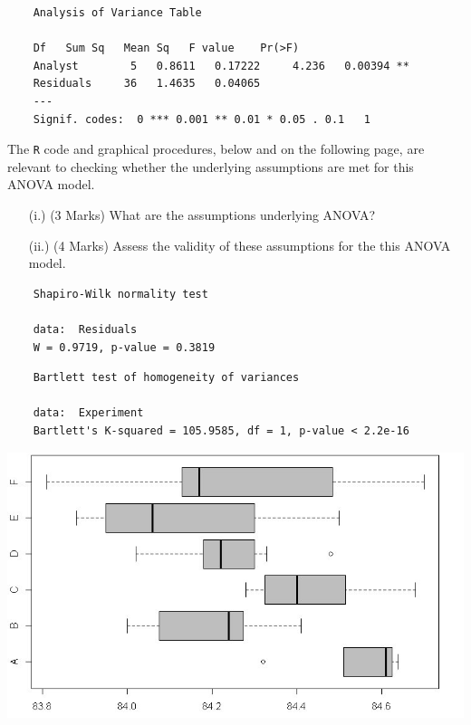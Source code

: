 \documentclass[a4paper,12pt]{article}
\begin{document}
\begin{framed}
	\begin{verbatim}
	Analysis of Variance Table
	
	Df   Sum Sq   Mean Sq   F value    Pr(>F)
	Analyst        5   0.8611   0.17222     4.236   0.00394 **
	Residuals     36   1.4635   0.04065
	---
	Signif. codes:  0 *** 0.001 ** 0.01 * 0.05 . 0.1   1
	\end{verbatim}
\end{framed}
The \texttt{R} code and graphical procedures, below and on the following page, are relevant to checking whether the underlying assumptions are met for this ANOVA model.
\begin{itemize}
	\item[(i.)] (3 Marks) What are the assumptions underlying ANOVA?
	\item[(ii.)] (4 Marks)  Assess the validity of these assumptions for the this ANOVA model.
\end{itemize}
\begin{framed}
	\begin{verbatim}
	Shapiro-Wilk normality test
	
	data:  Residuals
	W = 0.9719, p-value = 0.3819
	\end{verbatim}
\end{framed}
\begin{framed}
	\begin{verbatim}
	Bartlett test of homogeneity of variances
	
	data:  Experiment
	Bartlett's K-squared = 105.9585, df = 1, p-value < 2.2e-16
	\end{verbatim}
\end{framed}
\begin{center}
	\includegraphics[scale=0.59]{ExamQ5boxplot}
\end{center}
\end{document}
